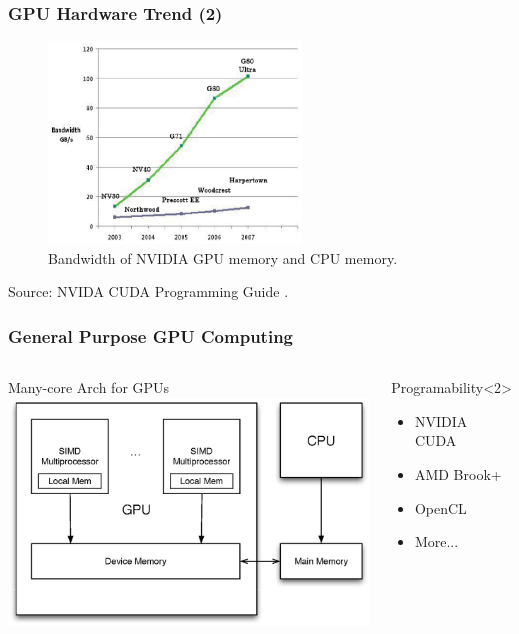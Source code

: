 \begin{frame}
\frametitle{GPU Hardware Trend (2)}
\begin{figure}[ht]
\centering
\includegraphics[width=0.60\textwidth]{figure/memory.eps}
\caption{Bandwidth of NVIDIA GPU memory and CPU memory.}
\end{figure}
\tiny{Source: NVIDA CUDA Programming Guide \cite{CUDA2008}.}
\end{frame}


\begin{frame}
\frametitle{General Purpose GPU Computing}
\begin{columns}
\begin{block}{Many-core Arch for GPUs}
\includegraphics[width=1.0\textwidth]{figure/gpuarch.eps}
\end{block}
\begin{block}{Programability}<2>
\begin{itemize}
\item NVIDIA CUDA
\item AMD Brook+
\item OpenCL
\item More... 
\end{itemize}
\end{block}
\end{columns}
\end{frame}

